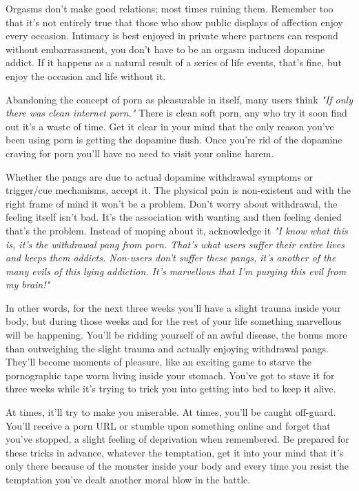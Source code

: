 \documentclass[easypeasy.tex]{subfiles}
\begin{document}
Orgasms don't make good relations; most times ruining them. Remember too that it's not entirely true that those who show public displays of affection enjoy every occasion. Intimacy is best enjoyed in private where partners can respond without embarrassment, you don't have to be an orgasm induced dopamine addict. If it happens as a natural result of a series of life events, that's fine, but enjoy the occasion and life without it.

Abandoning the concept of porn as pleasurable in itself, many users think \textit{"If only there was clean internet porn."} There is clean soft porn, any who try it soon find out it's a waste of time. Get it clear in your mind that the only reason you've been using porn is getting the dopamine flush. Once you're rid of the dopamine craving for porn you'll have no need to visit your online harem.

Whether the pangs are due to actual dopamine withdrawal symptoms or trigger/cue mechanisms, accept it. The physical pain is non-existent and with the right frame of mind it won't be a problem. Don't worry about withdrawal, the feeling itself isn't bad. It's the association with wanting and then feeling denied that's the problem. Instead of moping about it, acknowledge it \textit{"I know what this is, it's the withdrawal pang from porn. That's what users suffer their entire lives and keeps them addicts. Non-users don't suffer these pangs, it's another of the many evils of this lying addiction. It's marvellous that I'm purging this evil from my brain!"}

In other words, for the next three weeks you'll have a slight trauma inside your body, but during those weeks and for the rest of your life something marvellous will be happening. You'll be ridding yourself of an awful disease, the bonus more than outweighing the slight trauma and actually enjoying withdrawal pangs. They'll become moments of pleasure, like an exciting game to starve the pornographic tape worm living inside your stomach. You've got to stave it for three weeks while it's trying to trick you into getting into bed to keep it alive.

At times, it'll try to make you miserable. At times, you'll be caught off-guard. You'll receive a porn URL or stumble upon something online and forget that you've stopped, a slight feeling of deprivation when remembered. Be prepared for these tricks in advance, whatever the temptation, get it into your mind that it's only there because of the monster inside your body and every time you resist the temptation you've dealt another moral blow in the battle.
\end{document}
